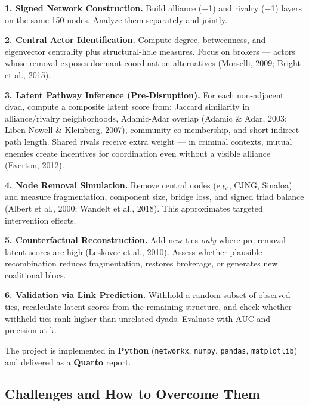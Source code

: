 \documentclass[
  11pt,
]{article}
\begin{document}
\textbf{1. Signed Network Construction.} Build alliance (+1) and rivalry
(−1) layers on the same 150 nodes. Analyze them separately and jointly.

\textbf{2. Central Actor Identification.} Compute degree, betweenness,
and eigenvector centrality plus structural-hole measures. Focus on
brokers --- actors whose removal exposes dormant coordination
alternatives (Morselli, 2009; Bright et al., 2015).

\textbf{3. Latent Pathway Inference (Pre-Disruption).} For each
non-adjacent dyad, compute a composite latent score from: Jaccard
similarity in alliance/rivalry neighborhoods, Adamic-Adar overlap
(Adamic \& Adar, 2003; Liben-Nowell \& Kleinberg, 2007), community
co-membership, and short indirect path length. Shared rivals receive
extra weight --- in criminal contexts, mutual enemies create incentives
for coordination even without a visible alliance (Everton, 2012).

\textbf{4. Node Removal Simulation.} Remove central nodes (e.g., CJNG,
Sinaloa) and measure fragmentation, component size, bridge loss, and
signed triad balance (Albert et al., 2000; Wandelt et al., 2018). This
approximates targeted intervention effects.

\textbf{5. Counterfactual Reconstruction.} Add new ties \emph{only}
where pre-removal latent scores are high (Leskovec et al., 2010). Assess
whether plausible recombination reduces fragmentation, restores
brokerage, or generates new coalitional blocs.

\textbf{6. Validation via Link Prediction.} Withhold a random subset of
observed ties, recalculate latent scores from the remaining structure,
and check whether withheld ties rank higher than unrelated dyads.
Evaluate with AUC and precision-at-k.

The project is implemented in \textbf{Python} (\texttt{networkx},
\texttt{numpy}, \texttt{pandas}, \texttt{matplotlib}) and delivered as a
\textbf{Quarto} report.

\subsection{Challenges and How to Overcome
Them}\label{challenges-and-how-to-overcome-them}
\end{document}
